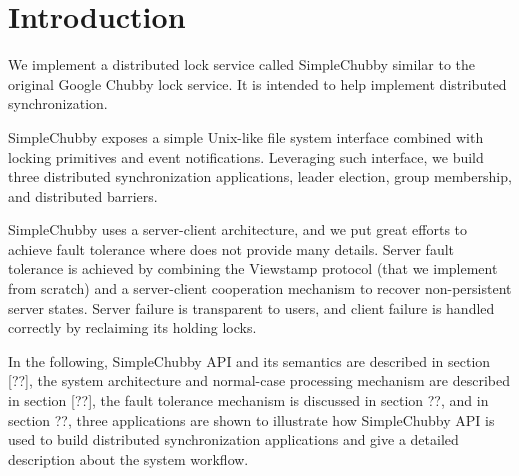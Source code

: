 \section{Introduction}

We implement a distributed lock service called SimpleChubby
similar to the original Google Chubby lock service\cite{burrows2006chubby}.
It is intended to help implement distributed synchronization.

SimpleChubby exposes a simple Unix-like file system interface
combined with locking primitives and event notifications.
Leveraging such interface, we build three distributed synchronization
applications, leader election, group membership, and distributed barriers.

SimpleChubby uses a server-client architecture,
and we put great efforts to achieve fault tolerance
where \cite{burrows2006chubby} does not provide many details.
Server fault tolerance is achieved by combining the Viewstamp protocol \cite{xxx}
(that we implement from scratch) and a server-client cooperation mechanism
to recover non-persistent server states.
Server failure is transparent to users, and client failure
is handled correctly by reclaiming its holding locks.

In the following,
SimpleChubby API and its semantics are described in section [??],
the system architecture and normal-case processing mechanism
are described in section [??],
the fault tolerance mechanism is discussed in section ??,
and in section ??, 
three applications are shown to illustrate
how SimpleChubby API is used to build 
distributed synchronization applications
and give a detailed description about the system workflow.

